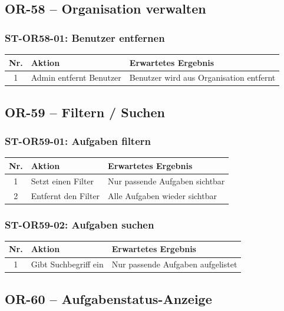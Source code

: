 \documentclass[a4paper,11pt]{article}
\begin{document}
\subsection{OR-58 -- Organisation verwalten}

\subsubsection*{ST-OR58-01: Benutzer entfernen}
\begin{longtable}{cp{5.5cm}p{5.5cm}}
    \toprule
    \textbf{Nr.} & \textbf{Aktion} & \textbf{Erwartetes Ergebnis} \\
    \midrule
    1 & Admin entfernt Benutzer & Benutzer wird aus Organisation entfernt \\
    \bottomrule
\end{longtable}

\subsection{OR-59 -- Filtern / Suchen}

\subsubsection*{ST-OR59-01: Aufgaben filtern}
\begin{longtable}{cp{5.5cm}p{5.5cm}}
    \toprule
    \textbf{Nr.} & \textbf{Aktion} & \textbf{Erwartetes Ergebnis} \\
    \midrule
    1 & Setzt einen Filter & Nur passende Aufgaben sichtbar \\
    2 & Entfernt den Filter & Alle Aufgaben wieder sichtbar \\
    \bottomrule
\end{longtable}

\subsubsection*{ST-OR59-02: Aufgaben suchen}
\begin{longtable}{cp{5.5cm}p{5.5cm}}
    \toprule
    \textbf{Nr.} & \textbf{Aktion} & \textbf{Erwartetes Ergebnis} \\
    \midrule
    1 & Gibt Suchbegriff ein & Nur passende Aufgaben aufgelistet \\
    \bottomrule
\end{longtable}


\subsection{OR-60 -- Aufgabenstatus-Anzeige}
\end{document}
